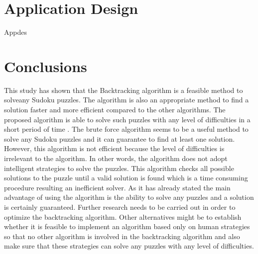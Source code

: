 \documentclass[12pt, letterpaper]{article}
\begin{document}
            \newpage
    \section{Application Design}
	 Appdes \newpage  
    \section{Conclusions}
    This study has shown that the Backtracking algorithm is a feasible method to solveany
    Sudoku puzzles. The algorithm is also an appropriate method to find a solution faster and more efficient compared to the other algorithms. The proposed algorithm is able to solve such puzzles with any level of difficulties in a short period of time .
    The brute force algorithm seems to be a useful method to solve any Sudoku puzzles and it can guarantee to find at least one solution. However, this algorithm is not efficient because the level of difficulties is irrelevant to the algorithm. In other words, the algorithm does not adopt intelligent strategies to solve the puzzles. This algorithm checks all possible solutions to the puzzle until a valid solution is found which is a time consuming procedure resulting an inefficient solver. As it has already stated the main advantage of using the algorithm is the ability to solve any puzzles and a solution is certainly guaranteed. Further research needs to be carried out in order to optimize the backtracking algorithm. Other alternatives might be to establish whether it is feasible to implement an algorithm based only on human strategies so that no other algorithm is involved in the backtracking algorithm and also make sure that these strategies can solve any puzzles with any level of difficulties.
	
	\newpage
\end{document}
